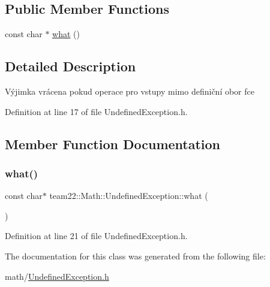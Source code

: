 \subsection*{Public Member Functions}
\begin{DoxyCompactItemize}
\item 
const char $\ast$ \hyperlink{classteam22_1_1_math_1_1_undefined_exception_a568d4e05844e57b984c3b37e3956d334}{what} ()
\end{DoxyCompactItemize}


\subsection{Detailed Description}
Výjimka vrácena pokud operace pro vstupy mimo definiční obor fce 

Definition at line 17 of file Undefined\+Exception.\+h.



\subsection{Member Function Documentation}
\mbox{\label{classteam22_1_1_math_1_1_undefined_exception_a568d4e05844e57b984c3b37e3956d334}} 
\subsubsection{\texorpdfstring{what()}{what()}}
{\footnotesize\ttfamily const char$\ast$ team22\+::\+Math\+::\+Undefined\+Exception\+::what (\begin{DoxyParamCaption}{ }\end{DoxyParamCaption})\hspace{0.3cm}{\ttfamily [inline]}}



Definition at line 21 of file Undefined\+Exception.\+h.



The documentation for this class was generated from the following file\+:\begin{DoxyCompactItemize}
\item 
math/\hyperlink{_undefined_exception_8h}{Undefined\+Exception.\+h}\end{DoxyCompactItemize}
